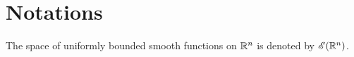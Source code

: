 \section{Notations}
\label{not}

The space of uniformly bounded smooth functions on $ \mathbb{ R }^n $
is denoted by $ \mathscr{  E  }( \mathbb{ R }^n ) $.
